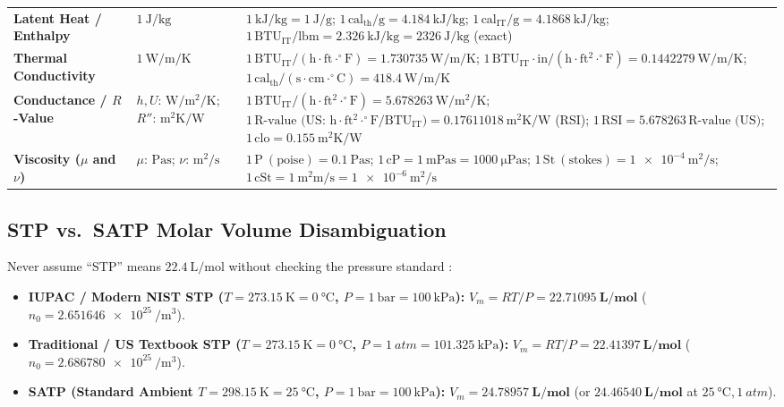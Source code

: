 \begin{center}
\begin{tabularx}{\linewidth}{@{}l l X@{}}
\textbf{Latent Heat / Enthalpy} & $\SI{1}{\joule\per\kilogram}$ & $\SI{1}{\kilo\joule\per\kilogram} = \SI{1}{\joule\per\gram}$; $1\,\mathrm{cal_{th}/g} = \SI{4.184}{\kilo\joule\per\kilogram}$; $1\,\mathrm{cal_{IT}/g} = \SI{4.1868}{\kilo\joule\per\kilogram}$; $1\,\mathrm{BTU_{IT}/lbm} = \SI{2.326}{\kilo\joule\per\kilogram} = \SI{2326}{\joule\per\kilogram}$ (exact) \\
\textbf{Thermal Conductivity} & $\SI{1}{\watt\per\meter\per\kelvin}$ & $1\,\mathrm{BTU_{IT}/(h\cdot ft\cdot^\circ F)} = \SI{1.730735}{\watt\per\meter\per\kelvin}$; $1\,\mathrm{BTU_{IT}\cdot in/(h\cdot ft^2\cdot^\circ F)} = \SI{0.1442279}{\watt\per\meter\per\kelvin}$; $1\,\mathrm{cal_{th}/(s\cdot cm\cdot^\circ C)} = \SI{418.4}{\watt\per\meter\per\kelvin}$ \\
\textbf{Conductance / $R$-Value} & $h, U$: $\si{\watt\per\square\meter\per\kelvin}$; $R''$: $\si{\square\meter\kelvin\per\watt}$ & $1\,\mathrm{BTU_{IT}/(h\cdot ft^2\cdot^\circ F)} = \SI{5.678263}{\watt\per\square\meter\per\kelvin}$; $1\,\text{R-value (US: }\mathrm{h\cdot ft^2\cdot^\circ F/BTU_{IT}}\text{)} = \SI{0.17611018}{\square\meter\kelvin\per\watt}$ (RSI); $1\,\mathrm{RSI} = 5.678263\,\text{R-value (US)}$; $1\,\mathrm{clo} = \SI{0.155}{\square\meter\kelvin\per\watt}$ \\
\textbf{Viscosity ($\mu$ and $\nu$)} & $\mu$: $\si{\pascal\second}$; $\nu$: $\si{\square\meter\per\second}$ & $1\,\mathrm{P\ (poise)} = \SI{0.1}{\pascal\second}$; $1\,\mathrm{cP} = \SI{1}{\milli\pascal\second} = \SI{1000}{\micro\pascal\second}$; $1\,\mathrm{St\ (stokes)} = \SI{1e-4}{\square\meter\per\second}$; $1\,\mathrm{cSt} = \SI{1}{\square\milli\meter\per\second} = \SI{1e-6}{\square\meter\per\second}$ \\\bottomrule
\end{tabularx}
\end{center}

\subsection{STP vs.\ SATP Molar Volume Disambiguation}
Never assume ``STP'' means $\SI{22.4}{\liter\per\mole}$ without checking the pressure standard :
\begin{itemize}
  \item \textbf{IUPAC / Modern NIST STP ($T = \SI{273.15}{\kelvin} = \SI{0}{\celsius}$, $P = \SI{1}{\bar} = \SI{100}{\kilo\pascal}$):} $V_m = RT/P = \mathbf{\SI{22.71095}{\liter\per\mole}}$ ($n_0 = \SI{2.651646e25}{\per\cubic\meter}$).
  \item \textbf{Traditional / US Textbook STP ($T = \SI{273.15}{\kelvin} = \SI{0}{\celsius}$, $P = \SI{1}{atm} = \SI{101.325}{\kilo\pascal}$):} $V_m = RT/P = \mathbf{\SI{22.41397}{\liter\per\mole}}$ ($n_0 = \SI{2.686780e25}{\per\cubic\meter}$).
  \item \textbf{SATP (Standard Ambient $T = \SI{298.15}{\kelvin} = \SI{25}{\celsius}$, $P = \SI{1}{\bar} = \SI{100}{\kilo\pascal}$):} $V_m = \mathbf{\SI{24.78957}{\liter\per\mole}}$ (or $\mathbf{\SI{24.46540}{\liter\per\mole}}$ at $\SI{25}{\celsius}, \SI{1}{atm}$).
\end{itemize}

